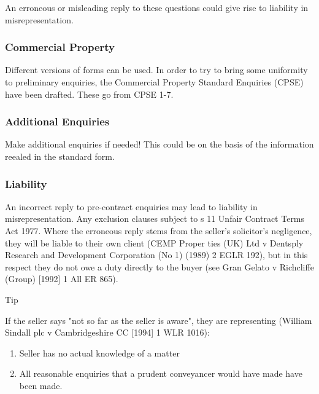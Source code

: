 \documentclass[
]{article}
\providecommand{\tightlist}{%
  \setlength{\itemsep}{0pt}\setlength{\parskip}{0pt}}
\newenvironment{env-c243631f-3ee6-42d0-b725-06e64724df04}
{
    \savenotes\tcolorbox[blanker,breakable,left=5pt,borderline west={2pt}{-4pt}{cyan}]
}
{
    \endtcolorbox\spewnotes
}
\begin{document}
An erroneous or misleading reply to these questions could give rise to
liability in misrepresentation.

\hypertarget{commercial-property}{%
\subsubsection{Commercial Property}\label{commercial-property}}

Different versions of forms can be used. In order to try to bring some
uniformity to preliminary enquiries, the Commercial Property Standard
Enquiries (CPSE) have been drafted. These go from CPSE 1-7.

\hypertarget{additional-enquiries}{%
\subsubsection{Additional Enquiries}\label{additional-enquiries}}

Make additional enquiries if needed! This could be on the basis of the
information reealed in the standard form.

\hypertarget{liability-2}{%
\subsubsection{Liability}\label{liability-2}}

An incorrect reply to pre-contract enquiries may lead to liability in
misrepresentation. Any exclusion clauses subject to s 11 Unfair Contract
Terms Act 1977. Where the erroneous reply stems from the seller's
solicitor's negligence, they will be liable to their own client (CEMP
Proper ties (UK) Ltd v Dentsply Research and Development Corporation (No
1) (1989) 2 EGLR 192), but in this respect they do not owe a duty
directly to the buyer (see Gran Gelato v Richcliffe (Group) {[}1992{]} 1
All ER 865).

\begin{env-c243631f-3ee6-42d0-b725-06e64724df04}

Tip

If the seller says "not so far as the seller is aware", they are
representing (William Sindall plc v Cambridgeshire CC {[}1994{]} 1 WLR
1016):

\begin{enumerate}
\tightlist
\item
  Seller has no actual knowledge of a matter
\item
  All reasonable enquiries that a prudent conveyancer would have made
  have been made.
\end{enumerate}

\end{env-c243631f-3ee6-42d0-b725-06e64724df04}
\end{document}
